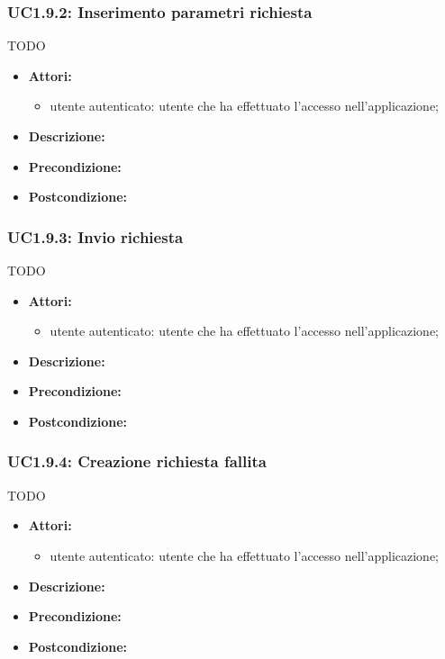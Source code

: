 \subsubsection{UC1.9.2: Inserimento parametri richiesta} TODO

\begin{itemize}
	\item \textbf{Attori:}
	\begin{itemize}
		\item utente autenticato: utente che ha effettuato l'accesso nell'applicazione;
	\end{itemize}
	\item \textbf{Descrizione:} 
	\item \textbf{Precondizione:} 
	\item \textbf{Postcondizione:} 
\end{itemize}

\subsubsection{UC1.9.3: Invio richiesta} TODO

\begin{itemize}
	\item \textbf{Attori:}
	\begin{itemize}
		\item utente autenticato: utente che ha effettuato l'accesso nell'applicazione;
	\end{itemize}
	\item \textbf{Descrizione:} 
	\item \textbf{Precondizione:} 
	\item \textbf{Postcondizione:} 
\end{itemize}
	
\subsubsection{UC1.9.4: Creazione richiesta fallita} TODO

\begin{itemize}
	\item \textbf{Attori:}
	\begin{itemize}
		\item utente autenticato: utente che ha effettuato l'accesso nell'applicazione;
	\end{itemize}
	\item \textbf{Descrizione:} 
	\item \textbf{Precondizione:} 
	\item \textbf{Postcondizione:} 
\end{itemize}



